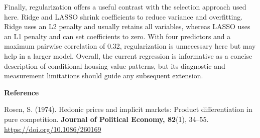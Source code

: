 \documentclass[11pt]{article}
\begin{document}
Finally, regularization offers a useful contrast with the selection approach used here. Ridge and LASSO shrink coefficients to reduce variance and overfitting. Ridge uses an L2 penalty and usually retains all variables, whereas LASSO uses an L1 penalty and can set coefficients to zero. With four predictors and a maximum pairwise correlation of 0.32, regularization is unnecessary here but may help in a larger model. Overall, the current regression is informative as a concise description of conditional housing-value patterns, but its diagnostic and measurement limitations should guide any subsequent extension.

\par\vspace{0.55em}
{\large\bfseries\color{navy}Reference\par}
\vspace{0.15em}
Rosen, S. (1974). Hedonic prices and implicit markets: Product differentiation in pure competition. \textbf{Journal of Political Economy, 82}(1), 34--55. \url{https://doi.org/10.1086/260169}
\end{document}
